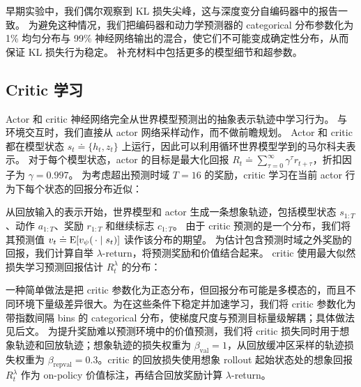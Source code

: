 早期实验中，我们偶尔观察到 KL 损失尖峰，这与深度变分自编码器中的报告一致\citep{child2020vdvae}。
为避免这种情况，我们把编码器和动力学预测器的 categorical 分布参数化为 1\% 均匀分布与 99\% 神经网络输出的混合，使它们不可能变成确定性分布，从而保证 KL 损失行为稳定。
补充材料中包括更多的模型细节和超参数。

\subsection*{Critic 学习}

Actor 和 critic 神经网络完全从世界模型预测出的抽象表示轨迹中学习行为\citep{sutton1991dyna}。
与环境交互时，我们直接从 actor 网络采样动作，而不做前瞻规划。
Actor 和 critic 都在模型状态 $s_t \doteq \{h_t,z_t\}$ 上运行，因此可以利用循环世界模型学到的马尔科夫表示。
对于每个模型状态，actor 的目标是最大化回报 $R_t \doteq \textstyle\sum_{\tau=0}^\infty \gamma^\tau r_{t+\tau}$，折扣因子为 $\gamma=0.997$。
为考虑超出预测时域 $T=16$ 的奖励，critic 学习在当前 actor 行为下每个状态的回报分布近似\citep{bellemare2017c51}：


从回放输入的表示开始，世界模型和 actor 生成一条想象轨迹，包括模型状态 $s_{1:T}$、动作 $a_{1:T}$、奖励 $r_{1:T}$ 和继续标志 $c_{1:T}$。
由于 critic 预测的是一个分布，我们将其预测值 $v_t \doteq \operatorname{E}[\p<v_\psi>(\,\cdot|s_t)]$ 读作该分布的期望。
为估计包含预测时域之外奖励的回报，我们计算自举 $\lambda$-return\citep{sutton2018rlbook}，将预测奖励和价值结合起来。
critic 使用最大似然损失学习预测回报估计 $R^\lambda_t$ 的分布：


一种简单做法是把 critic 参数化为正态分布，但回报分布可能是多模态的，而且不同环境下量级差异很大。为在这些条件下稳定并加速学习，我们将 critic 参数化为带指数间隔 bins 的 categorical 分布，使梯度尺度与预测目标量级解耦；具体做法见后文。
为提升奖励难以预测环境中的价值预测，我们将 critic 损失同时用于想象轨迹和回放轨迹；想象轨迹的损失权重为 $\beta_{\mathrm{val}}=1$，从回放缓冲区采样的轨迹损失权重为 $\beta_{\mathrm{repval}}=0.3$。critic 的回放损失使用想象 rollout 起始状态处的想象回报 $R^\lambda_t$ 作为 on-policy 价值标注，再结合回放奖励计算 $\lambda$-return。

